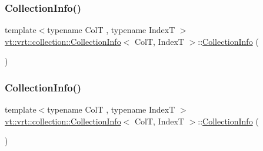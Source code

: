 \subsubsection{\texorpdfstring{Collection\+Info()}{CollectionInfo()}\hspace{0.1cm}{\footnotesize\ttfamily [1/3]}}
{\footnotesize\ttfamily template$<$typename ColT , typename IndexT $>$ \\
\hyperlink{structvt_1_1vrt_1_1collection_1_1_collection_info}{vt\+::vrt\+::collection\+::\+Collection\+Info}$<$ ColT, IndexT $>$\+::\hyperlink{structvt_1_1vrt_1_1collection_1_1_collection_info}{Collection\+Info} (\begin{DoxyParamCaption}{ }\end{DoxyParamCaption})\hspace{0.3cm}{\ttfamily [default]}}

\mbox{\label{structvt_1_1vrt_1_1collection_1_1_collection_info_a8b280b46f8afe9a170d718c08d8d5a54}} 
\subsubsection{\texorpdfstring{Collection\+Info()}{CollectionInfo()}\hspace{0.1cm}{\footnotesize\ttfamily [2/3]}}
{\footnotesize\ttfamily template$<$typename ColT , typename IndexT $>$ \\
\hyperlink{structvt_1_1vrt_1_1collection_1_1_collection_info}{vt\+::vrt\+::collection\+::\+Collection\+Info}$<$ ColT, IndexT $>$\+::\hyperlink{structvt_1_1vrt_1_1collection_1_1_collection_info}{Collection\+Info} (\begin{DoxyParamCaption}\item[{\hyperlink{structvt_1_1vrt_1_1collection_1_1_collection_info}{Collection\+Info}$<$ ColT, IndexT $>$ const \&}]{ }\end{DoxyParamCaption})\hspace{0.3cm}{\ttfamily [default]}}

\mbox{\label{structvt_1_1vrt_1_1collection_1_1_collection_info_a8f1f1ea8fffa846772e35288afad5767}} 
